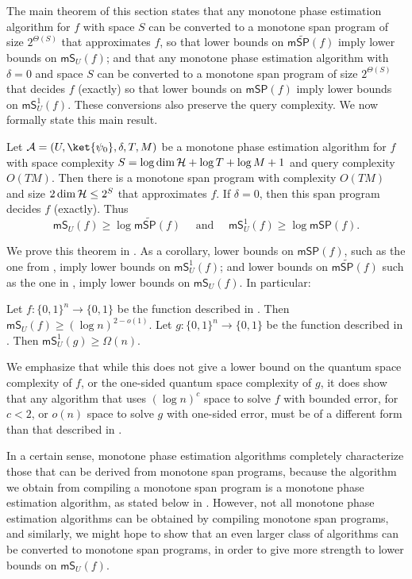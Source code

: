 \documentclass{toc}
\begin{document}
The main theorem of this section states that any monotone phase estimation algorithm for $f$ with space $S$ can be converted to a monotone span program of size $2^{\Theta(S)}$ that approximates $f$, so that lower bounds on $\mathsf{m}\widetilde{\mathsf{SP}}(f)$ imply lower bounds on $\mathsf{mS}_U(f)$; and that any monotone phase estimation algorithm with $\delta=0$ and space $S$ can be converted to a monotone span program of size $2^{\Theta(S)}$ that decides $f$ (exactly) so that lower bounds on $\mathsf{mSP}(f)$ imply lower bounds on $\mathsf{mS}_U^1(f)$. These conversions also preserve the query complexity. We now formally state this main result.

\begin{theorem}\label{thm:monotone-alg-to-span}
Let ${\cal A}=(U,\ket{\psi_0},\delta,T,M)$ be a monotone phase estimation algorithm for $f$ with space complexity $S=\log\dim {\cal H}+\log T+\log M+1$ and query complexity $O(TM)$. Then there is a monotone span program with complexity $O(TM)$ and size $2\dim{\cal H}\leq 2^{S}$ that approximates $f$. If $\delta=0$, then this span program decides $f$ (exactly). Thus
$$\mathsf{mS}_U(f)\geq \log \mathsf{m}\widetilde{\mathsf{SP}}(f)\quad\mbox{ and }\quad
\mathsf{mS}_U^1(f) \geq\log \mathsf{mSP}(f) .$$
\end{theorem}
We prove this theorem in . As a corollary, lower bounds on $\mathsf{mSP}(f)$, such as the one from \cite{PR17}, imply lower bounds on $\mathsf{mS}_U^1(f)$;
and lower bounds on $\mathsf{m}\widetilde{\mathsf{SP}}(f)$ such as the one in , imply lower bounds on $\mathsf{mS}_U(f)$. In particular:
\begin{corollary}\label{cor:explicit-mS}
Let $f:\{0,1\}^n\rightarrow\{0,1\}$ be the function described in . Then $\mathsf{mS}_U(f)\geq (\log n)^{2-o(1)}$.
Let $g:\{0,1\}^n\rightarrow\{0,1\}$ be the function described in . Then $\mathsf{mS}_U^1(g)\geq \Omega(n)$.
\end{corollary}
We emphasize that while this does not give a lower bound on the quantum space complexity of $f$, or the one-sided quantum space complexity of $g$, it does show that any algorithm that uses $(\log n)^{c}$ space to solve $f$ with bounded error, for $c<2$, or $o(n)$ space to solve $g$ with one-sided error, must be of a different form than that described in . 


In a certain sense, monotone phase estimation algorithms completely characterize those that can be derived from monotone span programs, because the algorithm we obtain from compiling a monotone span program is a monotone phase estimation algorithm, as stated below in . However, not all monotone phase estimation algorithms can be obtained by compiling monotone span programs, and similarly, we might hope to show that an even larger class of algorithms can be converted to monotone span programs, in order to give more strength to lower bounds on $\mathsf{mS}_U(f)$.
\end{document}

